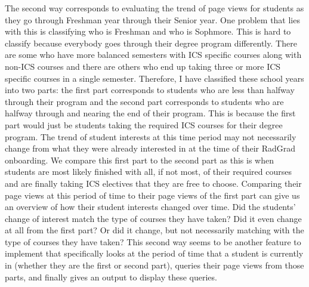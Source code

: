 \documentclass[english]{proposalnsf}
\begin{document}
  The second way corresponds to evaluating the trend of page views for students as they go through Freshman year through
  their Senior year. One problem that lies with this is classifying who is Freshman and who is Sophmore. This is hard to
  classify because everybody goes through their degree program differently. There are some who have more balanced semesters
  with ICS specific courses along with non-ICS courses and there are others who end up taking three or more ICS specific
  courses in a single semester. Therefore, I have classified these school years into two parts: the first part corresponds
  to students who are less than halfway through their program and the second part corresponds to students who are halfway
  through and nearing the end of their program. This is because the first part would just be students taking the required
  ICS courses for their degree program. The trend of student interests at this time period may not necessarily change from
  what they were already interested in at the time of their RadGrad onboarding. We compare this first part to the second part
  as this is when students are most likely finished with all, if not most, of their required courses and are finally taking
  ICS electives that they are free to choose. Comparing their page views at this period of time to their page views of the first
  part can give us an overview of how their student interests changed over time. Did the students' change of interest match
  the type of courses they have taken? Did it even change at all from the first part? Or did it change, but not necessarily
  matching with the type of courses they have taken? This second way seems to be another feature to implement that
  specifically looks at the period of time that a student is currently in (whether they are the first or second part),
  queries their page views from those parts, and finally gives an output to display these queries.

  \appendix
\end{document}
